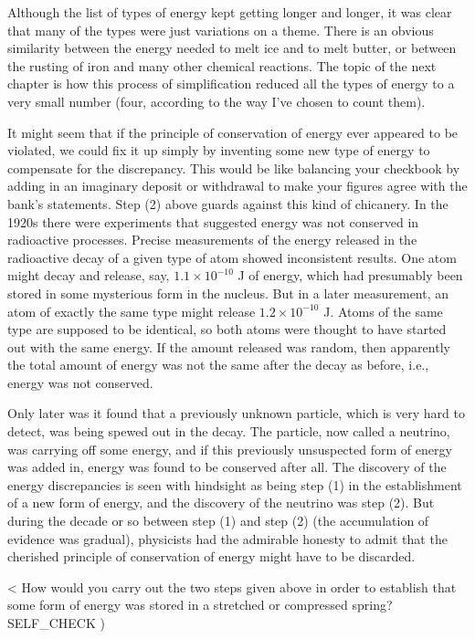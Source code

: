 Although the list of types of energy kept getting longer and
longer, it was clear that many of the types were just
variations on a theme. There is an obvious similarity
between the energy needed to melt ice and to melt butter,
or between the rusting of iron and many other chemical
reactions. The topic of the next chapter is how this process
of simplification reduced all the types of energy to a very
small number (four, according to the way I've chosen to count them).

It might seem that if the principle of conservation of
energy ever appeared to be violated, we could fix it up
simply by inventing some new type of energy to compensate
for the discrepancy. This would be like balancing your
checkbook by adding in an imaginary deposit or withdrawal to
make your figures agree with the bank's statements. Step (2)
above guards against this kind of chicanery. In the 1920s
there were experiments that suggested energy was not
conserved in radioactive processes. Precise measurements of
the energy released in the radioactive decay of a given type
of atom showed inconsistent results. One atom might decay
and release, say, $1.1\times10^{-10}$ J of energy, which had
presumably been stored in some mysterious form in the
nucleus. But in a later measurement, an atom of exactly the
same type might release $1.2\times10^{-10}$ J. Atoms of the
same type are supposed to be identical, so both atoms were
thought to have started out with the same energy. If the
amount released was random, then apparently the total amount
of energy was not the same after the decay as before, i.e.,
energy was not conserved.

Only later was it found that a previously unknown particle,
which is very hard to detect, was being spewed out in the
decay. The particle, now called a neutrino, was carrying off
some energy, and if this previously unsuspected form of
energy was added in, energy was found to be conserved after
all. The discovery of the energy discrepancies is seen with
hindsight as being step (1) in the establishment of a new
form of energy, and the discovery of the neutrino was step
(2). But during the decade or so between step (1) and step
(2) (the accumulation of evidence was gradual), physicists
had the admirable honesty to admit that the cherished
principle of conservation of energy might have to be discarded.

<%
How would you carry out the two steps given above in order
to establish that some form of energy was stored in a
stretched or compressed spring?
  SELF_CHECK
  ) %

